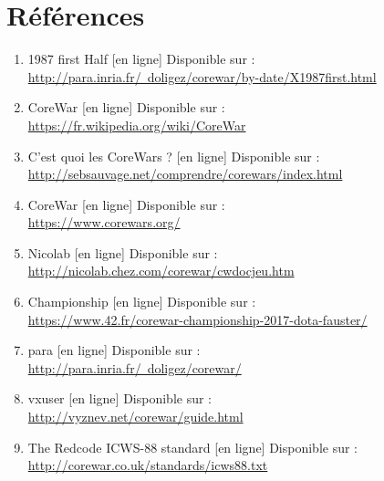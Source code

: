 \documentclass[a4paper,12pt]{article}
\begin{document}
\section{Références}
\begin{enumerate}
\item 1987 first Half [en ligne] Disponible sur : \\
\href{http://para.inria.fr/~doligez/corewar/by-date/X1987first.htm}{http://para.inria.fr/~doligez/corewar/by-date/X1987first.html}

\item CoreWar [en ligne] Disponible sur : \\
\href{https://fr.wikipedia.org/wiki/Core_War}{https://fr.wikipedia.org/wiki/CoreWar}

\item C'est quoi les CoreWars ? [en ligne] Disponible sur : \\
\href{http://sebsauvage.net/comprendre/corewars/index.html}{http://sebsauvage.net/comprendre/corewars/index.html}

\item CoreWar [en ligne] Disponible sur : \\
\href{https://www.corewars.org/}{https://www.corewars.org/}

\item Nicolab [en ligne] Disponible sur : \\
\href{http://nicolab.chez.com/corewar/cw_docjeu.htm}{http://nicolab.chez.com/corewar/cwdocjeu.htm}

\item Championship [en ligne] Disponible sur : \\
\href{https://www.42.fr/corewar-championship-2017-dota-fauster/}{https://www.42.fr/corewar-championship-2017-dota-fauster/}

\item para [en ligne] Disponible sur : \\
\href{http://para.inria.fr/~doligez/corewar/}{http://para.inria.fr/~doligez/corewar/}

\item vxuser [en ligne] Disponible sur : \\
\href{http://vyznev.net/corewar/guide.html}{http://vyznev.net/corewar/guide.html}

\item The Redcode ICWS-88 standard [en ligne] Disponible sur : \\
\href{http://corewar.co.uk/standards/icws88.txt}{http://corewar.co.uk/standards/icws88.txt}
\end{enumerate}
\end{document}
